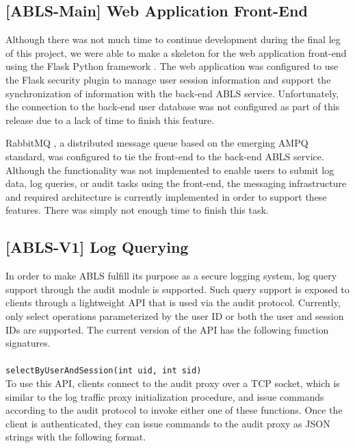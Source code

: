 \documentclass{sig-alternate}
\begin{document}
\subsection{[ABLS-Main] Web Application Front-End}
Although there was not much time to continue development during the final leg of this project, we were able to 
make a skeleton for the web application front-end using the Flask Python framework \cite{flask}. The web application
was configured to use the Flask security plugin to manage user session information and support the synchronization of  
information with the back-end ABLS service. Unfortunately, the connection to the back-end user database was not 
configured as part of this release due to a lack of time to finish this feature.

RabbitMQ \cite{rabbitmq}, a
distributed message queue based on the emerging AMPQ standard, was configured to tie the front-end to the 
back-end ABLS service. Although the functionality was not implemented to enable users to submit log data, log queries,
or audit tasks using the front-end, the messaging infrastructure and required architecture is currently implemented in order 
to support these features. There was simply not enough time to finish this task. 

\subsection{[ABLS-V1] Log Querying}
\label{sec:querying}
In order to make ABLS fulfill its purpose as a secure logging system, log query support through the audit
module is supported. Such query support is exposed to clients through a lightweight API that is used via the audit protocol.
Currently, only select operations parameterized by the user ID or both the user and session IDs are supported. 
The current version of the API has the following function signatures. \\

 \\
{\tt selectByUserAndSession(int uid, int sid)}\\

To use this API, clients connect to the audit proxy over a TCP socket, which is similar to the log traffic proxy initialization 
procedure, and issue commands according to the audit protocol to invoke either one of these functions. Once the client is 
authenticated, they can issue commands to the audit proxy as JSON strings with the following format. \\
\end{document}
